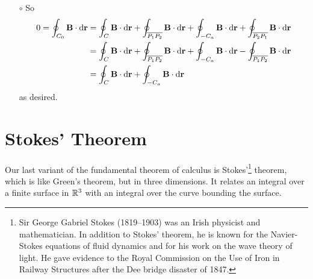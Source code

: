 \begin{eg}
{\begin{itemize}
\noindent
Pick any point $P_0$ on the original curve $C$. The curve $C_0$
\begin{itemize}\itemsep1pt \parskip0pt  %
\item
first\footnote{It doesn't matter where $C_0$ starts from.
For concreteness, we can start it at the point, $P_0=(\sin 1,0,0)$, where 
the original curve $C$ intersects the positive $x$-axis.} 
follows the original curve $C$ from $P_0$ counterclockwise to the point $P_1$
on the negative $x$-axis.
\item 
Then it follows the negative $x$-axis towards the origin until it
hits $C_a$ at the point $P_2$.
\item 
Then it circumnavigates $C_a$ once clockwise, returning to $P_2$.
\item
Then it follows the negative $x$-axis away from the origin until it
returns to $P_1$.
\item
Finally it follows $C$ back to its starting point.
\end{itemize}

\item[$\circ$]
So
\begin{align*}
0=\oint_{C_0}\mathbf{B}\cdot\mathrm{d}\mathbf{r}
&=\oint_{C}\mathbf{B}\cdot\mathrm{d}\mathbf{r}
 +\oint_{\overline{P_1 P_2}}\mathbf{B}\cdot\mathrm{d}\mathbf{r}
 +\oint_{-C_a}\mathbf{B}\cdot\mathrm{d}\mathbf{r}
 +\oint_{\overline{P_2 P_1}}\mathbf{B}\cdot\mathrm{d}\mathbf{r} \\
&=\oint_{C}\mathbf{B}\cdot\mathrm{d}\mathbf{r}
 +\oint_{\overline{P_1 P_2}}\mathbf{B}\cdot\mathrm{d}\mathbf{r}
 +\oint_{-C_a}\mathbf{B}\cdot\mathrm{d}\mathbf{r}
 -\oint_{\overline{P_1 P_2}}\mathbf{B}\cdot\mathrm{d}\mathbf{r} \\
&=\oint_{C}\mathbf{B}\cdot\mathrm{d}\mathbf{r}
 +\oint_{-C_a}\mathbf{B}\cdot\mathrm{d}\mathbf{r}
\end{align*}
as desired.
\end{itemize}
}
\end{eg}


\section{Stokes' Theorem}\label{sec:StokesThm}
Our last variant of the fundamental theorem of calculus is 
Stokes'\footnote{Sir George Gabriel Stokes (1819--1903) was an Irish physicist and mathematician. In addition to Stokes' theorem, he is known for the Navier-Stokes equations of fluid dynamics and for his work on the wave theory
of light. He gave evidence to the Royal Commission on the Use of Iron in 
Railway Structures after the Dee bridge disaster of 1847.} theorem, which is like Green's theorem, but in three dimensions.
It relates an integral over a finite surface 
in $\mathbb{R}^3$ with an integral over the curve bounding the surface. 

